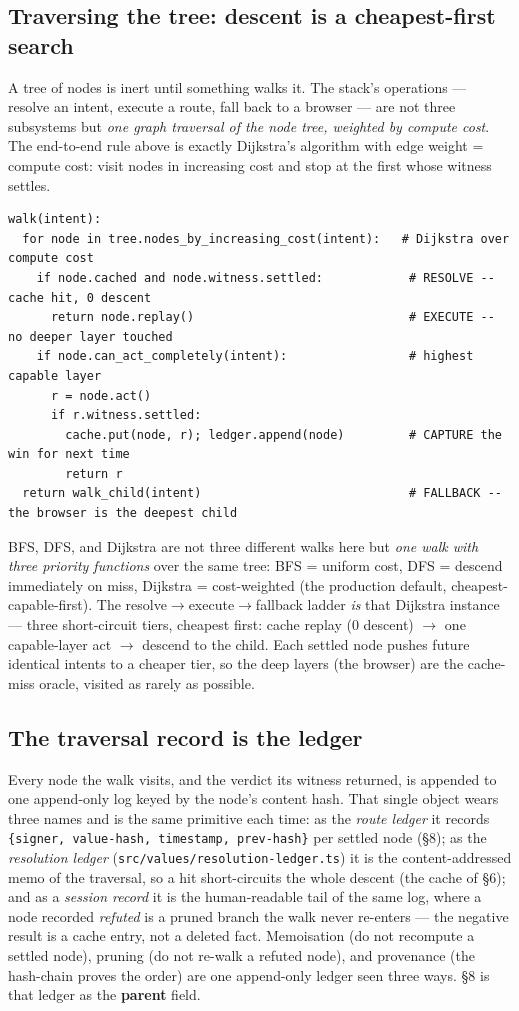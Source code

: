 \documentclass[11pt]{article}
\begin{document}
\subsection{Traversing the tree: descent is a cheapest-first search}

A tree of nodes is inert until something walks it. The stack's operations ---
resolve an intent, execute a route, fall back to a browser --- are not three
subsystems but \emph{one graph traversal of the node tree, weighted by compute
cost}. The end-to-end rule above is exactly Dijkstra's algorithm with edge weight =
compute cost: visit nodes in increasing cost and stop at the first whose witness
settles.
\begin{verbatim}
walk(intent):
  for node in tree.nodes_by_increasing_cost(intent):   # Dijkstra over compute cost
    if node.cached and node.witness.settled:            # RESOLVE -- cache hit, 0 descent
      return node.replay()                              # EXECUTE -- no deeper layer touched
    if node.can_act_completely(intent):                 # highest capable layer
      r = node.act()
      if r.witness.settled:
        cache.put(node, r); ledger.append(node)         # CAPTURE the win for next time
        return r
  return walk_child(intent)                             # FALLBACK -- the browser is the deepest child
\end{verbatim}
BFS, DFS, and Dijkstra are not three different walks here but \emph{one walk with
three priority functions} over the same tree: BFS = uniform cost, DFS = descend
immediately on miss, Dijkstra = cost-weighted (the production default,
cheapest-capable-first). The resolve$\to$execute$\to$fallback ladder \emph{is} that
Dijkstra instance --- three short-circuit tiers, cheapest first: cache replay (0
descent) $\to$ one capable-layer act $\to$ descend to the child. Each settled node
pushes future identical intents to a cheaper tier, so the deep layers (the browser)
are the cache-miss oracle, visited as rarely as possible.

\subsection{The traversal record is the ledger}

Every node the walk visits, and the verdict its witness returned, is appended to one
append-only log keyed by the node's content hash. That single object wears three
names and is the same primitive each time: as the \emph{route ledger} it records
\texttt{\{signer, value-hash, timestamp, prev-hash\}} per settled node (\S8); as the
\emph{resolution ledger} (\texttt{src/values/resolution-ledger.ts}) it is the
content-addressed memo of the traversal, so a hit short-circuits the whole descent
(the cache of \S6); and as a \emph{session record} it is the human-readable tail of
the same log, where a node recorded \emph{refuted} is a pruned branch the walk never
re-enters --- the negative result is a cache entry, not a deleted fact. Memoisation
(do not recompute a settled node), pruning (do not re-walk a refuted node), and
provenance (the hash-chain proves the order) are one append-only ledger seen three
ways. \S8 is that ledger as the \textbf{parent} field.
\end{document}
